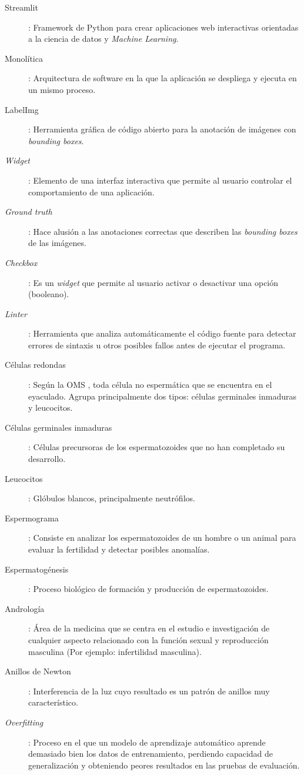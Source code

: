 \documentclass[12pt,a4paper,onecolumn,oneside]{report}
\begin{document}
\begin{description}
  \item[Streamlit]: Framework de Python para crear aplicaciones web interactivas orientadas a la ciencia de datos y \textit{Machine Learning}.
  \item[Monolítica]: Arquitectura de software en la que la aplicación se despliega y ejecuta en un mismo proceso.     
  \item[LabelImg]: Herramienta gráfica de código abierto para la anotación de imágenes con \textit{bounding boxes}.
  \item[\textit{Widget}]: Elemento de una interfaz interactiva que permite al usuario controlar el comportamiento de una aplicación.
  \item[\textit{Ground truth}]: Hace alusión a las anotaciones correctas que describen las \textit{bounding boxes} de las imágenes.
  \item[\textit{Checkbox}]: Es un \textit{widget} que permite al usuario activar o desactivar una opción (booleano).  
  \item[\textit{Linter}]:  Herramienta que analiza automáticamente el código fuente para detectar errores de sintaxis u otros posibles fallos antes de ejecutar el programa. 
  \item[Células redondas]: Según la OMS \cite{OMS}, toda célula no espermática que se encuentra en el eyaculado. Agrupa principalmente dos tipos: células germinales inmaduras y leucocitos.
  \item[Células germinales inmaduras]: Células precursoras de los espermatozoides que no han completado su desarrollo.
  \item[Leucocitos]: Glóbulos blancos, principalmente neutrófilos.  
  \item[Espermograma]: Consiste en analizar los espermatozoides de un hombre o un animal para evaluar la fertilidad y detectar posibles anomalías. 
  \item[Espermatogénesis]: Proceso biológico de formación y producción de espermatozoides.
  \item[Andrología]: Área de la medicina que se centra en el estudio e investigación de cualquier aspecto relacionado con la función sexual y reproducción masculina (Por ejemplo: infertilidad masculina).  
  \item[Anillos de Newton]: Interferencia de la luz cuyo resultado es un patrón de anillos muy característico.
  \item[\textit{Overfitting}]: Proceso en el que un modelo de aprendizaje automático aprende demasiado bien los datos de entrenamiento, perdiendo capacidad de generalización y obteniendo peores resultados en las pruebas de evaluación.

\end{description}
\end{document}
